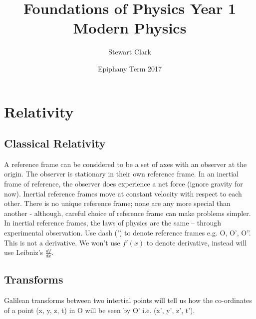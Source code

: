 \documentclass[a4paper, 11pt, normalem]{report}
\title{Foundations of Physics Year 1 \\ Modern Physics \vspace{-20pt}}
\author{Stewart Clark}
\date{\vspace{-15pt}Epiphany Term 2017}
\begin{document}
\maketitle
\tableofcontents

\chapter{Relativity}
\section{Classical Relativity}
A reference frame can be considered to be a set of axes with an observer at the origin.
The observer is stationary in their own reference frame.
In an inertial frame of reference, the observer does experience a net force (ignore gravity for now).
Inertial reference frames move at constant velocity with respect to each other.
There is no unique reference frame; none are any more special than another - although, careful choice of reference frame can make problems simpler.
In inertial reference frames, the laws of physics are the same -- through experimental observation.
Use dash (') to denote reference frames e.g. O, O', O''.
This is not a derivative.
We won't use $f'(x)$ to denote derivative, instead will use Leibniz's $\frac{df}{dx}$.

\section{Transforms}
Galilean transforms between two intertial points will tell us how the co-ordinates of a point (x, y, z, t) in O will be seen by O' i.e. (x', y', z', t').
\end{document}
